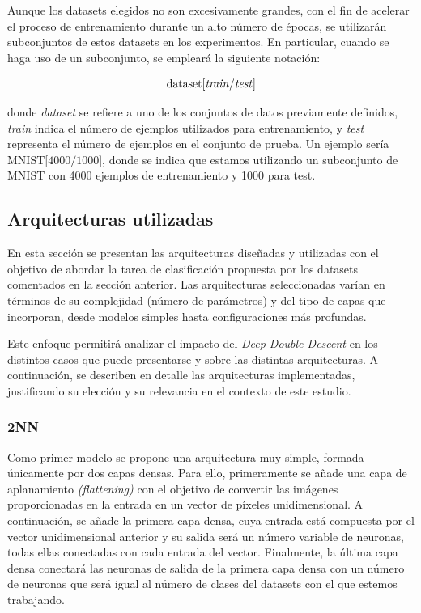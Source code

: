 Aunque los datasets elegidos no son excesivamente grandes, con el fin de acelerar el proceso de entrenamiento durante un alto número de épocas, se utilizarán subconjuntos de estos datasets en los experimentos. En particular, cuando se haga uso de un subconjunto, se empleará la siguiente notación:

\[
    \text{dataset}[\text{\textit{train}/\textit{test}}]
\]

donde \textit{dataset} se refiere a uno de los conjuntos de datos previamente definidos, \textit{train} indica el número de ejemplos utilizados para entrenamiento, y \textit{test} representa el número de ejemplos en el conjunto de prueba. Un ejemplo sería MNIST[$4000/1000$], donde se indica que estamos utilizando un subconjunto de MNIST con 4000 ejemplos de entrenamiento y 1000 para test.\newline

\subsection{Arquitecturas utilizadas}\label{subsec:arquitecturas}

En esta sección se presentan las arquitecturas diseñadas y utilizadas con el objetivo de abordar la tarea de clasificación propuesta por los datasets comentados en la sección anterior. Las arquitecturas seleccionadas varían en términos de su complejidad (número de parámetros) y del tipo de capas que incorporan, desde modelos simples hasta configuraciones más profundas.\newline

Este enfoque permitirá analizar el impacto del \textit{Deep Double Descent} en los distintos casos que puede presentarse y sobre las distintas arquitecturas. A continuación, se describen en detalle las arquitecturas implementadas, justificando su elección y su relevancia en el contexto de este estudio.\newline

\subsubsection{2NN}\label{subsubsec:2NN}

Como primer modelo se propone una arquitectura muy simple, formada únicamente por dos capas densas. Para ello, primeramente se añade una capa de aplanamiento \textit{(flattening)} con el objetivo de convertir las imágenes proporcionadas en la entrada en un vector de píxeles unidimensional. A continuación, se añade la primera capa densa, cuya entrada está compuesta por el vector unidimensional anterior y su salida será un número variable de neuronas, todas ellas conectadas con cada entrada del vector. Finalmente, la última capa densa conectará las neuronas de salida de la primera capa densa con un número de neuronas que será igual al número de clases del datasets con el que estemos trabajando.\newline

